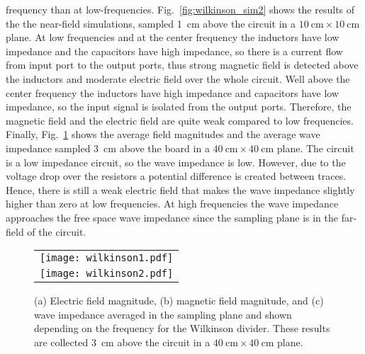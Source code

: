 frequency than at low-frequencies. Fig.~\ref{fig:wilkinson_sim2} shows the results of the the near-field simulations, sampled \SI{1}{\centi\meter} above the circuit in a $\SI{10}{\centi\meter} \times \SI{10}{\centi\meter}$ plane. At low frequencies and at the center frequency the inductors have low impedance and the capacitors have high impedance, so there is a current flow from input port to the output ports, thus strong magnetic field is detected above the inductors and moderate electric field over the whole circuit. Well above the center frequency the inductors have high impedance and capacitors have low impedance, so the input signal is isolated from the output ports. Therefore, the magnetic field and the electric field are quite weak compared to low frequencies. Finally, Fig.~\ref{fig:wilkinson_sim3} shows the average field magnitudes and the average wave impedance sampled \SI{3}{\centi\meter} above the board in a $\SI{40}{\centi\meter} \times \SI{40}{\centi\meter}$ plane. The circuit is a low impedance circuit, so the wave impedance is low. However, due to the voltage drop over the resistors a potential difference is created between traces. Hence, there is still a weak electric field that makes the wave impedance slightly higher than zero at low frequencies. At high frequencies the wave impedance approaches the free space wave impedance since the sampling plane is in the far-field of the circuit.
\begin{figure}
	\centering
\begin{tabular}{c}
	\texttt{[image: wilkinson1.pdf]}\\
	\texttt{[image: wilkinson2.pdf]}
\end{tabular}
\caption{Near-field simulation results collected \SI{1}{\centi\meter} above the circuit in a $\SI{10}{\centi\meter} \times \SI{10}{\centi\meter}$ plane for the Wilkinson divider.}
\label{fig:wilkinson_sim2}
\centering
{}\hfill
{}\par 
{}
\caption{(a) Electric field magnitude, (b) magnetic field magnitude, and (c) wave impedance averaged in the sampling plane and shown depending on the frequency for the Wilkinson divider. These results are collected \SI{3}{\centi\meter} above the circuit in a $\SI{40}{\centi\meter}\times \SI{40}{\centi\meter}$ plane.}
\label{fig:wilkinson_sim3}
\end{figure}
\FloatBarrier

